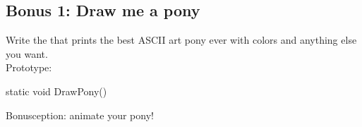 \subsection{Bonus 1: Draw me a pony}

Write the  that prints the best ASCII art pony ever with
colors and anything else you want.\\

Prototype:
\begin{code}
static void DrawPony()
\end{code}

Bonusception: animate your pony!
